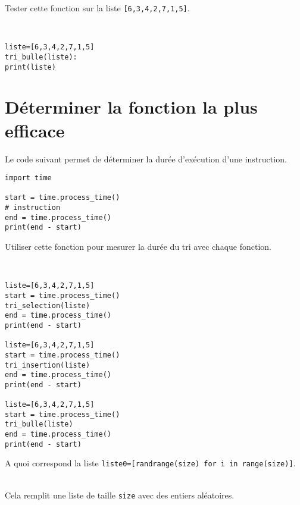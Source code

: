 \begin{exercice}
Tester cette fonction sur la liste \verb?[6,3,4,2,7,1,5]?.
\end{exercice}

\begin{solution}~\\
\vspace{-0.7cm}
\begin{verbatim}
liste=[6,3,4,2,7,1,5]
tri_bulle(liste): 
print(liste)
\end{verbatim}    
\end{solution}

\section{Déterminer la fonction la plus efficace}

Le code suivant permet de déterminer la durée d'exécution d'une instruction.

\begin{verbatim}
import time

start = time.process_time()
# instruction
end = time.process_time()
print(end - start)
\end{verbatim} 

\begin{exercice}
Utiliser cette fonction pour mesurer la durée du tri avec chaque fonction.
\end{exercice}

\begin{solution}~\\
\vspace{-0.7cm}
\begin{verbatim}
liste=[6,3,4,2,7,1,5]
start = time.process_time()
tri_selection(liste)
end = time.process_time()
print(end - start)

liste=[6,3,4,2,7,1,5]
start = time.process_time()
tri_insertion(liste)
end = time.process_time()
print(end - start)

liste=[6,3,4,2,7,1,5]
start = time.process_time()
tri_bulle(liste)
end = time.process_time()
print(end - start)
\end{verbatim}    
\end{solution}

\begin{exercice}
A quoi correspond la liste \verb?liste0=[randrange(size) for i in range(size)]?.
\end{exercice}

\begin{solution}~\\
\vspace{-0.7cm}
Cela remplit une liste de taille \verb?size? avec des entiers aléatoires.
\newpage
\end{solution}

